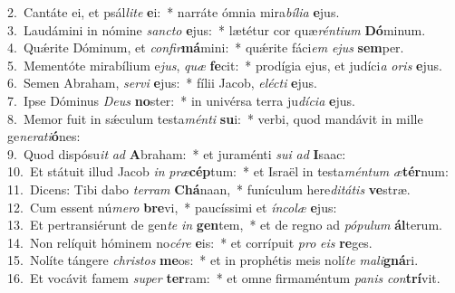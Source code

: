{2.~}Cantáte ei, et psál\textit{li}\textit{te} \textbf{e}i:~* narráte ómnia mira\textit{bí}\textit{li}\textit{a} \textbf{e}jus.\\
{3.~}Laudámini in nómine \textit{san}\textit{cto} \textbf{e}jus:~* lætétur cor quæ\textit{rén}\textit{ti}\textit{um} \textbf{Dó}minum.\\
{4.~}Quǽrite Dóminum, et \textit{con}\textit{fir}\textbf{má}mini:~* quǽrite fáci\textit{em} \textit{e}\textit{jus} \textbf{sem}per.\\
{5.~}Mementóte mirabílium e\textit{jus}, \textit{quæ} \textbf{fe}cit:~* prodígia ejus, et judíci\textit{a} \textit{o}\textit{ris} \textbf{e}jus.\\
{6.~}Semen Abraham, \textit{ser}\textit{vi} \textbf{e}jus:~* fílii Jacob, \textit{e}\textit{lé}\textit{cti} \textbf{e}jus.\\
{7.~}Ipse Dóminus \textit{De}\textit{us} \textbf{no}ster:~* in univérsa terra ju\textit{dí}\textit{ci}\textit{a} \textbf{e}jus.\\
{8.~}Memor fuit in sǽculum testa\textit{mén}\textit{ti} \textbf{su}i:~* verbi, quod mandávit in mille ge\textit{ne}\textit{ra}\textit{ti}\textbf{ó}nes:\\
{9.~}Quod dispósu\textit{it} \textit{ad} \textbf{A}braham:~* et juraménti \textit{su}\textit{i} \textit{ad} \textbf{I}saac:\\
{10.~}Et státuit illud Jacob \textit{in} \textit{præ}\textbf{cép}tum:~* et Israël in testa\textit{mén}\textit{tum} \textit{æ}\textbf{tér}num:\\
{11.~}Dicens: Tibi dabo \textit{ter}\textit{ram} \textbf{Chá}naan,~* funículum here\textit{di}\textit{tá}\textit{tis} \textbf{ve}stræ.\\
{12.~}Cum essent nú\textit{me}\textit{ro} \textbf{bre}vi,~* paucíssimi et \textit{ín}\textit{co}\textit{læ} \textbf{e}jus:\\
{13.~}Et pertransiérunt de gen\textit{te} \textit{in} \textbf{gen}tem,~* et de regno ad \textit{pó}\textit{pu}\textit{lum} \textbf{ál}terum.\\
{14.~}Non relíquit hóminem no\textit{cé}\textit{re} \textbf{e}is:~* et corrípuit \textit{pro} \textit{e}\textit{is} \textbf{re}ges.\\
{15.~}Nolíte tángere \textit{chri}\textit{stos} \textbf{me}os:~* et in prophétis meis nolí\textit{te} \textit{ma}\textit{li}\textbf{gná}ri.\\
{16.~}Et vocávit famem \textit{su}\textit{per} \textbf{ter}ram:~* et omne firmaméntum \textit{pa}\textit{nis} \textit{con}\textbf{trí}vit.\\
